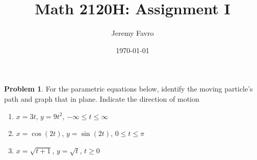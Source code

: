 \documentclass[10pt]{article}
\title{Math 2120H: Assignment I}
\author{Jeremy Favro}
\date{\today}
\theoremstyle{definition}
\newtheorem{problem}{Problem}
\begin{document}
\maketitle

\begin{problem} For the parametric equations below, identify the moving particle's path and graph that in plane. Indicate the direction of motion
\begin{enumerate}[label=(\alph*)]
  \item $x=3t$, \qquad $y=9t^2$, \qquad $-\infty\leq t\leq \infty$
  \item $x=\cos(2t)$, \qquad $y=\sin(2t)$, \qquad $0\leq t\leq \pi$
  \item $x=\sqrt{t+1}$, \qquad $y=\sqrt{t}$, \qquad $t\geq 0$
\end{enumerate}
\end{problem}
\end{document}
